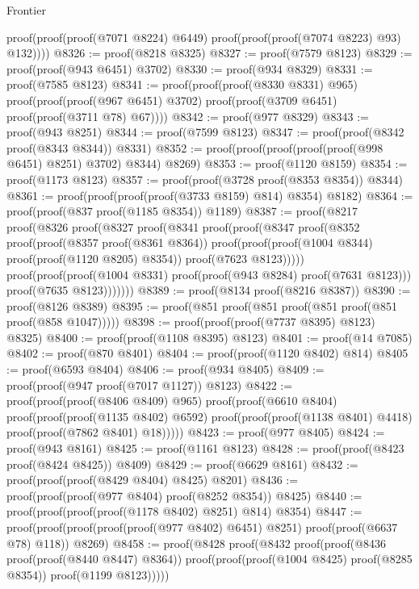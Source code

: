 \begin{lexlean}{Frontier}
\begin{coremodule}
          proof(proof(proof(@7071 @8224) @6449) proof(proof(proof(@7074 @8223) @93) @132))))
@8326 := proof(@8218 @8325)
@8327 := proof(@7579 @8123)
@8329 := proof(proof(@943 @6451) @3702)
@8330 := proof(@934 @8329)
@8331 := proof(@7585 @8123)
@8341 := proof(proof(proof(@8330 @8331) @965)
      proof(proof(proof(@967 @6451) @3702) proof(proof(@3709 @6451) proof(proof(@3711 @78) @67))))
@8342 := proof(@977 @8329)
@8343 := proof(@943 @8251)
@8344 := proof(@7599 @8123)
@8347 := proof(proof(@8342 proof(@8343 @8344)) @8331)
@8352 := proof(proof(proof(proof(proof(@998 @6451) @8251) @3702) @8344) @8269)
@8353 := proof(@1120 @8159)
@8354 := proof(@1173 @8123)
@8357 := proof(proof(@3728 proof(@8353 @8354)) @8344)
@8361 := proof(proof(proof(proof(@3733 @8159) @814) @8354) @8182)
@8364 := proof(proof(@837 proof(@1185 @8354)) @1189)
@8387 := proof(@8217
      proof(@8326
          proof(@8327
              proof(@8341
                  proof(proof(@8347
                        proof(@8352
                            proof(proof(@8357 proof(@8361 @8364))
                                proof(proof(proof(@1004 @8344) proof(proof(@1120 @8205) @8354))
                                    proof(@7623 @8123)))))
                      proof(proof(proof(@1004 @8331) proof(proof(@943 @8284) proof(@7631 @8123)))
                          proof(@7635 @8123)))))))
@8389 := proof(@8134 proof(@8216 @8387))
@8390 := proof(@8126 @8389)
@8395 := proof(@851 proof(@851 proof(@851 proof(@851 proof(@858 @1047)))))
@8398 := proof(proof(proof(@7737 @8395) @8123) @8325)
@8400 := proof(proof(@1108 @8395) @8123)
@8401 := proof(@14 @7085)
@8402 := proof(@870 @8401)
@8404 := proof(proof(@1120 @8402) @814)
@8405 := proof(@6593 @8404)
@8406 := proof(@934 @8405)
@8409 := proof(proof(@947 proof(@7017 @1127)) @8123)
@8422 := proof(proof(proof(@8406 @8409) @965)
      proof(proof(@6610 @8404)
          proof(proof(proof(@1135 @8402) @6592)
              proof(proof(proof(@1138 @8401) @4418) proof(proof(@7862 @8401) @18)))))
@8423 := proof(@977 @8405)
@8424 := proof(@943 @8161)
@8425 := proof(@1161 @8123)
@8428 := proof(proof(@8423 proof(@8424 @8425)) @8409)
@8429 := proof(@6629 @8161)
@8432 := proof(proof(proof(@8429 @8404) @8425) @8201)
@8436 := proof(proof(proof(@977 @8404) proof(@8252 @8354)) @8425)
@8440 := proof(proof(proof(proof(@1178 @8402) @8251) @814) @8354)
@8447 := proof(proof(proof(proof(proof(@977 @8402) @6451) @8251) proof(proof(@6637 @78) @118))
      @8269)
@8458 := proof(@8428
      proof(@8432
          proof(proof(@8436 proof(proof(@8440 @8447) @8364))
              proof(proof(proof(@1004 @8425) proof(@8285 @8354)) proof(@1199 @8123)))))

\end{coremodule}
\end{lexlean}
